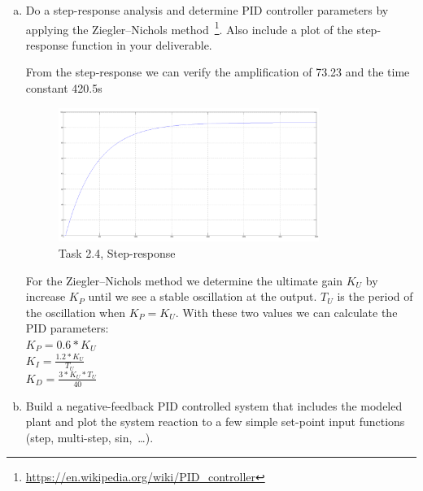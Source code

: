 \documentclass[12pt,a4paper,oneside]{article}
\begin{document}
\begin{enumerate}[a)]
\item Do a step-response analysis and determine PID controller parameters by
  applying the Ziegler–Nichols
  method~\footnote{\url{https://en.wikipedia.org/wiki/PID_controller}}.  Also
  include a plot of the step-response function in your deliverable.
  
From the step-response we can verify the amplification of 73.23 and the time constant 420.5s
\begin{figure}[htb]
  \centering
  \includegraphics[width=0.8\textwidth]{step_response_2_4.png}
  \caption{Task 2.4, Step-response}
  \label{fig:heat}
\end{figure}
For the Ziegler–Nichols method we determine the ultimate gain $K_U$ by increase $K_P$ until we see a stable oscillation at the output. 
$T_U$ is the period of the oscillation when $K_P=K_U$. With these two values we can calculate the PID parameters:\\
$K_P=0.6*K_U$\\
$K_I=\frac{1.2*K_U}{T_U}$\\
$K_D=\frac{3*K_U*T_U}{40}$\\
\item Build a negative-feedback PID controlled system that includes the modeled
  plant and plot the system reaction to a few simple set-point input functions
  (step, multi-step, sin,~\ldots).
  

\end{enumerate}
\end{document}
